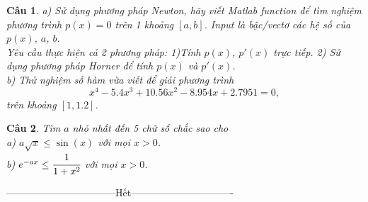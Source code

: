 \documentclass[11pt]{article}
\newtheorem{bt}{Câu}
\begin{document}
\begin{bt} %
a) Sử dụng phương pháp Newton, hãy viết Matlab function để tìm nghiệm phương trình $p(x)=0$ trên 1 khoảng $[a,b]$. Input là bậc/vectơ các hệ số của $p(x)$, $a$, $b$. \\
Yêu cầu thực hiện cả 2 phương pháp: 1)Tính $p(x)$, $p'(x)$ trực tiếp. 2) Sử dụng phương pháp Horner để tính $p(x)$ và $p'(x)$. \\
b) Thử nghiệm số hàm vừa viết để giải phương trình 
%
\[ x^4 - 5.4 x^3 + 10.56 x^2 - 8.954 x + 2.7951 = 0, \]
%
trên khoảng $[1,1.2]$. 
\end{bt}

\begin{bt} %
Tìm $a$ nhỏ nhất đến 5 chữ số chắc sao cho\\
a) $a \sqrt{x} \leq \sin(x)$ với mọi $x>0$. \\
b) $e^{-ax} \leq \cfrac{1}{1+x^2}$ với mọi $x>0$.
\end{bt}

\centerline{———————————Hết——————————-}
\end{document}
